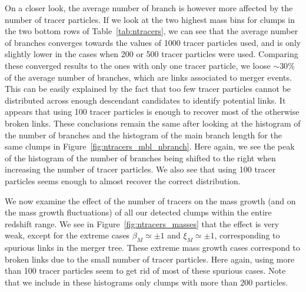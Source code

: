On a closer look, the average number of branch is however more
affected by the number of tracer particles. If we look at the two highest
mass bins for clumps in the two bottom rows of Table~\ref{tab:ntracers},
we can see that the average number of branches converges towards
the values of 1000 tracer particles used, and is only slightly lower in
the cases when 200 or 500 tracer particles were used. Comparing these
converged results to the ones with only one tracer particle,
we loose $\sim 30\%$ of the average number of branches, which are
links associated to merger events.  This
can be easily explained by the fact that too few tracer particles
cannot be distributed across enough descendant candidates to identify
potential links. It appears that using 100 tracer particles is enough
to recover most of the otherwise broken links. These
conclusions remain the same after looking at the histogram of the
number of branches and the histogram of the main branch length for the
same clumps in Figure~\ref{fig:ntracers_mbl_nbranch}. Here again, we
see the peak of the histogram of the number of branches being shifted
to the right when increasing the number of tracer particles. We also
see that using 100 tracer particles seems enough to almost recover the
correct distribution.

We now examine the effect of the number of tracers on the mass growth
(and on the mass growth fluctuations) of all our detected clumps
within the entire redshift range. We see in
Figure~\ref{fig:ntracers_masses} that the effect is very weak, except
for the extreme cases $\beta_M \simeq \pm 1$ and $\xi_M \simeq \pm 1$,
corresponding to spurious links in the merger tree. These extreme mass
growth cases correspond to broken links due to the
small number of tracer particles. Here again, using more than 100
tracer particles seem to get rid of most of these spurious cases.
Note that we include in these histograms only clumps with more than
200 particles.

